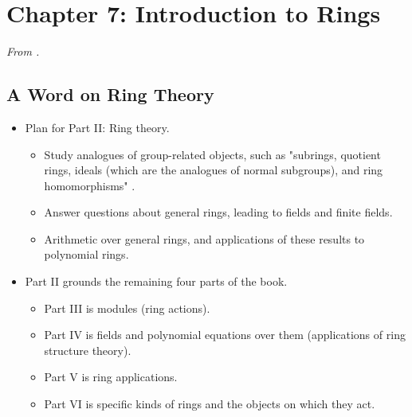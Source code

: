 \documentclass[../notes.tex]{subfiles}
\begin{document}
\section{Chapter 7: Introduction to Rings}
\emph{From \textcite{bib:DummitFoote}.}
\setcounter{bookch}{7}
\subsection*{A Word on Ring Theory}
\begin{itemize}
    \item {}Plan for Part II: Ring theory.
    \begin{itemize}
        \item Study analogues of group-related objects, such as "subrings, quotient rings, ideals (which are the analogues of normal subgroups), and ring homomorphisms" \parencite[222]{bib:DummitFoote}.
        \item Answer questions about general rings, leading to fields and finite fields.
        \item Arithmetic over general rings, and applications of these results to polynomial rings.
    \end{itemize}
    \item Part II grounds the remaining four parts of the book.
    \begin{itemize}
        \item Part III is modules (ring actions).
        \item Part IV is fields and polynomial equations over them (applications of ring structure theory).
        \item Part V is ring applications.
        \item Part VI is specific kinds of rings and the objects on which they act.
    \end{itemize}
\end{itemize}
\end{document}
